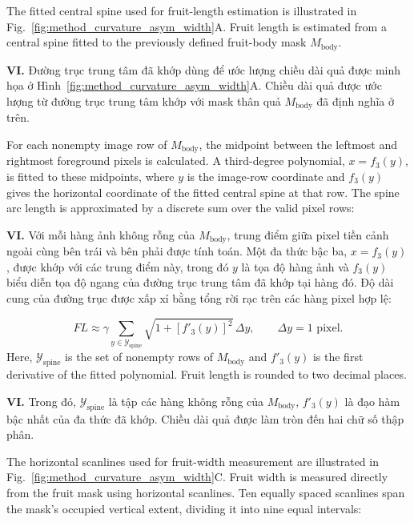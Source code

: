 \documentclass[final,1p,11pt,longtitle]{elsarticle}
\newenvironment{viet}{\par\smallskip\begingroup\color{viColor}\noindent\textbf{VI. }\ignorespaces}{\par\endgroup\smallskip}
\begin{document}
The fitted central spine used for fruit-length estimation is illustrated in Fig.~\ref{fig:method_curvature_asym_width}A. Fruit length is estimated from a central spine fitted to the previously defined fruit-body mask $M_{\mathrm{body}}$.

\begin{viet}
Đường trục trung tâm đã khớp dùng để ước lượng chiều dài quả được minh họa ở Hình~\ref{fig:method_curvature_asym_width}A. Chiều dài quả được ước lượng từ đường trục trung tâm khớp với mask thân quả $M_{\mathrm{body}}$ đã định nghĩa ở trên.
\end{viet}

For each nonempty image row of $M_{\mathrm{body}}$, the midpoint between the leftmost and rightmost foreground pixels is calculated. A third-degree polynomial, $x=f_3(y)$, is fitted to these midpoints, where $y$ is the image-row coordinate and $f_3(y)$ gives the horizontal coordinate of the fitted central spine at that row. The spine arc length is approximated by a discrete sum over the valid pixel rows:

\begin{viet}
Với mỗi hàng ảnh không rỗng của $M_{\mathrm{body}}$, trung điểm giữa pixel tiền cảnh ngoài cùng bên trái và bên phải được tính toán. Một đa thức bậc ba, $x=f_3(y)$, được khớp với các trung điểm này, trong đó $y$ là tọa độ hàng ảnh và $f_3(y)$ biểu diễn tọa độ ngang của đường trục trung tâm đã khớp tại hàng đó. Độ dài cung của đường trục được xấp xỉ bằng tổng rời rạc trên các hàng pixel hợp lệ:
\end{viet}


\begin{equation}
 FL\approx\gamma\sum_{y\in\mathcal{Y}_{\mathrm{spine}}}\sqrt{1+\left[f'_3(y)\right]^2}\,\Delta y,\qquad\Delta y=1\text{ pixel}.
\end{equation}
Here, $\mathcal{Y}_{\mathrm{spine}}$ is the set of nonempty rows of $M_{\mathrm{body}}$ and $f'_3(y)$ is the first derivative of the fitted polynomial. Fruit length is rounded to two decimal places.

\begin{viet}
Trong đó, $\mathcal{Y}_{\mathrm{spine}}$ là tập các hàng không rỗng của $M_{\mathrm{body}}$, $f'_3(y)$ là đạo hàm bậc nhất của đa thức đã khớp. Chiều dài quả được làm tròn đến hai chữ số thập phân.
\end{viet}


The horizontal scanlines used for fruit-width measurement are illustrated in Fig.~\ref{fig:method_curvature_asym_width}C. Fruit width is measured directly from the fruit mask using horizontal
scanlines. Ten equally spaced scanlines span the mask's occupied vertical
extent, dividing it into nine equal intervals:
\end{document}
